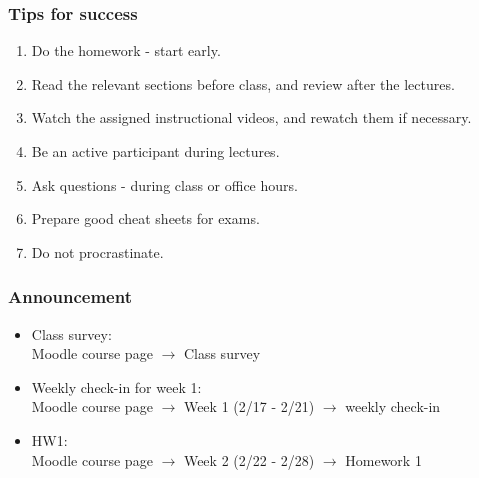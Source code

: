 \documentclass[slidestop,compress,mathserif]{beamer}
\begin{document}

\begin{frame}
\frametitle{Tips for success}

\begin{enumerate}
\item Do the homework - start early.
\item Read the relevant sections before class, and review after the lectures.
\item Watch the assigned instructional videos, and rewatch them if necessary.
\item Be an active participant during lectures.
\item Ask questions - during class or office hours.
\item Prepare good cheat sheets for exams.
\item Do not procrastinate.
\end{enumerate}

\end{frame}



\begin{frame}\frametitle{Announcement}

\begin{itemize}
\item Class survey: \\
Moodle course page $\longrightarrow$ Class survey\\

\item Weekly check-in for week 1: \\
Moodle course page $\longrightarrow$ Week 1 (2/17 - 2/21) $\longrightarrow$ weekly check-in\\

\item HW1: \\
Moodle course page $\longrightarrow$ Week 2 (2/22 - 2/28) $\longrightarrow$ Homework 1\\




\end{itemize}

\end{frame}



\end{document}
